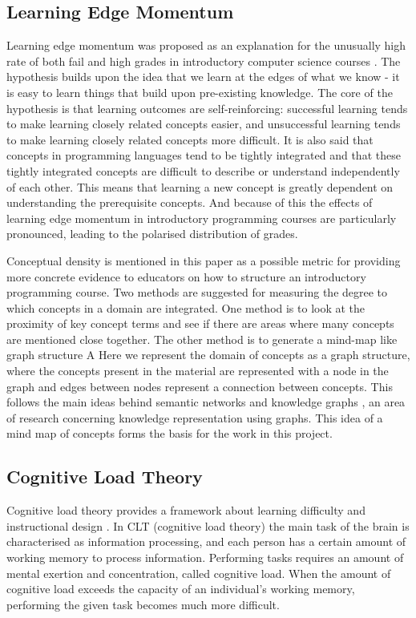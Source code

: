 \documentclass[12pt]{article}
\theoremstyle{grammarstyle}
\begin{document}
\subsection{Learning Edge Momentum}
Learning edge momentum was proposed as an explanation for the unusually high rate of both fail and high grades in introductory computer science courses \citep{robins2010learning}. The hypothesis builds upon the idea that we learn at the edges of what we know - it is easy to learn things that build upon pre-existing knowledge. The core of the hypothesis is that learning outcomes are self-reinforcing: successful learning  tends to make learning closely related concepts easier, and unsuccessful learning tends to make learning closely related concepts more difficult. It is also said that concepts in programming languages tend to be tightly integrated and that these tightly integrated concepts are difficult to describe or understand independently of each other. This means that learning a new concept is greatly dependent on understanding the prerequisite concepts. And because of this the effects of learning edge momentum in introductory programming courses are particularly pronounced, leading to the polarised distribution of grades. 

Conceptual density is mentioned in this paper as a possible metric for providing more concrete evidence to educators on how to structure an introductory programming course. Two methods are suggested for measuring the degree to which concepts in a domain are integrated. One method is to look at the proximity of key concept terms and see if there are areas where many concepts are mentioned close together. The other method is to generate a mind-map like graph structure A Here we represent the domain of concepts as a graph structure, where the concepts present in the material are represented with a node in the graph and edges between nodes represent a connection between concepts. This follows the main ideas behind semantic networks and knowledge graphs \citep{sowa1987semantic, zhang2002knowledge, koncel2019text}, an area of research concerning knowledge representation using graphs. This idea of a mind map of concepts forms the basis for the work in this project.

\subsection{Cognitive Load Theory}
Cognitive load theory provides a framework about learning difficulty and instructional design \citep{sweller1994cognitive}. In CLT (cognitive load theory) the main task of the brain is characterised as information processing, and each person has a certain amount of working memory to process information. Performing tasks requires an amount of mental exertion and concentration, called cognitive load. When the amount of cognitive load exceeds the capacity of an individual's working memory, performing the given task becomes much more difficult. 
\end{document}
